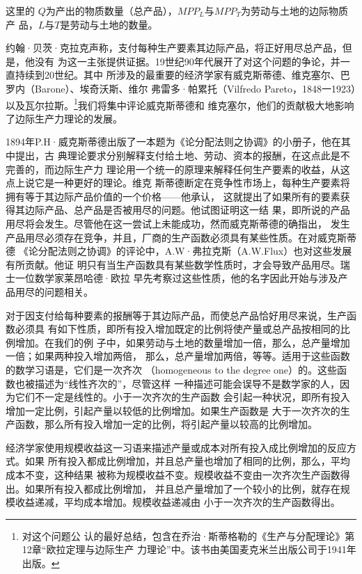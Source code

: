 这里的 $Q$为产出的物质数量（总产品），$MPP_L与MPP_T$为劳动与土地的边际物质产
品，$L与T$是劳动与土地的数量。

约翰·贝茨·克拉克声称，支付每种生产要素其边际产品，将正好用尽总产品，但是，他没有
为这一主张提供证据。19世纪90年代展开了对这个问题的争论，并一直持续到20世纪。其中
所涉及的最重要的经济学家有威克斯蒂德、维克塞尔、巴罗内（Barone）、埃奇沃斯、维尔
弗雷多·帕累托（Vilfredo Pareto，1848一1923）以及瓦尔拉斯。\footnote{对这个问题公
  认的最好总结，包含在乔治·斯蒂格勒的《生产与分配理论》第12章“欧拉定理与边际生产
  力理论”中。该书由美国麦克米兰出版公司于1941年出版。}我们将集中评论威克斯蒂德和
维克塞尔，他们的贡献极大地影响了边际生产力理论的发展。

1894年P.H·威克斯蒂德出版了一本题为《论分配法则之协调》的小册子，他在其中提出，古
典理论要求分别解释支付给土地、劳动、资本的报酬，在这点此是不完善的，而边际生产力
理论用一个统一的原理来解释任何生产要素的收益，从这点上说它是一种更好的理论。维克
斯蒂德断定在竞争性市场上，每种生产要素将拥有等于其边际产品价值的一个价格——他承认，
这就提出了如果所有的要素获得其边际产品、总产品是否被用尽的问题。他试图证明这一结
果，即所说的产品用尽将会发生。尽管他在这一尝试上未能成功，然而威克斯蒂德的确指出，
发生产品用尽必须存在竞争，并且，厂商的生产函数必须具有某些性质。在对威克斯蒂德
《论分配法则之协调》的评论中，A.W·弗拉克斯（A.W.Flux）也对这些发展有所贡献。他证
明只有当生产函数具有某些数学性质时，才会导致产品用尽。瑞士一位数学家莱昂哈德·欧拉
早先考察过这些性质，他的名字因此开始与涉及产品用尽的问题相关。

对于因支付给每种要素的报酬等于其边际产品，而使总产品恰好用尽来说，生产函数必须具
有如下性质，即所有投入增加既定的比例将使产量或总产品按相同的比例增加。在我们的例
子中，如果劳动与土地的数量增加一倍，那么，总产量增加一倍；如果两种投入增加两倍，
那么，总产量增加两倍，等等。适用于这些函数的数学习语是，它们是一次齐次
（homogeneous to the degree one）的。这些函数也被描述为“线性齐次的”，尽管这样
一种描述可能会误导不是数学家的人，因为它们不一定是线性的。小于一次齐次的生产函数
会引起一种状况，即所有投入增加一定比例，引起产量以较低的比例增加。如果生产函数是
大于一次齐次的生产函数，那么所有投入增加一定的比例，将引起产量以较高的比例增加。

经济学家使用规模收益这一习语来描述产量或成本对所有投入成比例增加的反应方式。如果
所有投入都成比例增加，并且总产量也增加了相同的比例，那么，平均成本不变，这种结果
被称为规模收益不变。规模收益不变由一次齐次生产函数得出。如果所有投入都成比例增加，
并且总产量增加了一个较小的比例，就存在规模收益递减，平均成本增加。规模收益递减由
小于一次齐次的生产函数得出。

